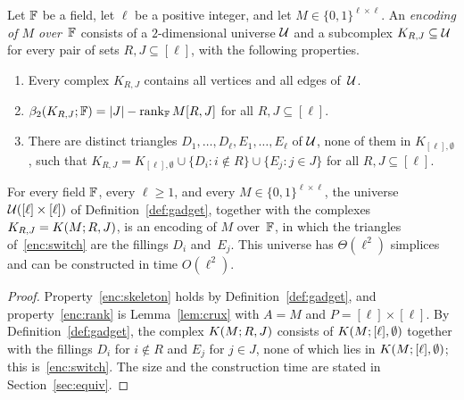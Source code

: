 \begin{definition}[Encoding]\label{def:encoding}
Let $\mathbb{F}$ be a field, let $\ell$ be a positive integer, and let $M\in\{0,1\}^{\ell\times\ell}$.
An \emph{encoding of $M$ over~$\mathbb{F}$} consists of a $2$-dimensional universe $\mathcal{U}$ and a subcomplex $K_{R,J}\subseteq\mathcal{U}$ for every pair of sets $R,J\subseteq[\ell]$, with the following properties.
\begin{enumerate}[label=(E\arabic*)]
\item\label{enc:skeleton} Every complex $K_{R,J}$ contains all vertices and all edges of~$\mathcal{U}$.
\item\label{enc:rank} $\beta_2(K_{R,J};\mathbb{F})=|J|-\operatorname{rank}_{\mathbb{F}}M[R,J]$ for all $R,J\subseteq[\ell]$.
\item\label{enc:switch} There are distinct triangles $D_1,\dots,D_\ell,E_1,\dots,E_\ell$ of $\mathcal{U}$, none of them in $K_{[\ell],\emptyset}$, such that $K_{R,J}=K_{[\ell],\emptyset}\cup\{D_i:i\notin R\}\cup\{E_j:j\in J\}$ for all $R,J\subseteq[\ell]$.
\end{enumerate}
\end{definition}

\begin{lemma}\label{lem:gadget-encoding}
For every field $\mathbb{F}$, every $\ell\ge1$, and every $M\in\{0,1\}^{\ell\times\ell}$, the universe $\mathcal{U}([\ell]\times[\ell])$ of Definition~\ref{def:gadget}, together with the complexes $K_{R,J}=K(M;R,J)$, is an encoding of $M$ over~$\mathbb{F}$, in which the triangles of~\ref{enc:switch} are the fillings $D_i$ and~$E_j$.
This universe has $\Theta(\ell^2)$ simplices and can be constructed in time $O(\ell^2)$.
\end{lemma}

\begin{proof}
Property~\ref{enc:skeleton} holds by Definition~\ref{def:gadget}, and property~\ref{enc:rank} is Lemma~\ref{lem:crux} with $A=M$ and $P=[\ell]\times[\ell]$.
By Definition~\ref{def:gadget}, the complex $K(M;R,J)$ consists of $K(M;[\ell],\emptyset)$ together with the fillings $D_i$ for $i\notin R$ and $E_j$ for $j\in J$, none of which lies in $K(M;[\ell],\emptyset)$; this is~\ref{enc:switch}.
The size and the construction time are stated in Section~\ref{sec:equiv}.
\end{proof}

